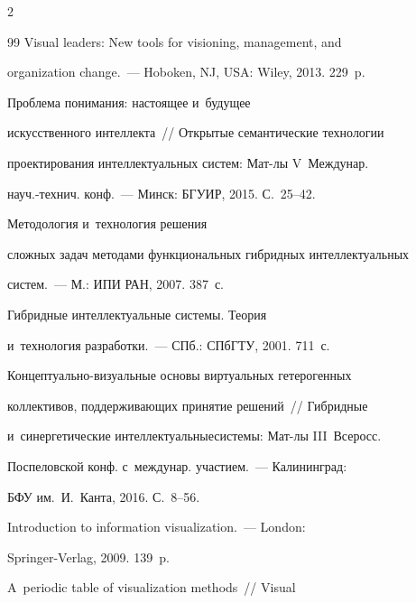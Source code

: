 \begin{multicols}{2}
{{\begin{thebibliography}{99}
 Visual leaders: New tools for visioning, management, and 


organization change.~--- Hoboken, NJ, USA: Wiley, 2013. 229~p.


 




   Проблема понимания: настоящее и~будущее 


искусственного интеллекта~// Открытые семантические технологии 


проектирования интеллектуальных систем: Мат-лы V~Междунар. 


науч.-технич. конф.~--- Минск: БГУИР, 2015. С.~25--42.




   Методология и~технология решения 


сложных задач методами функциональных гибридных интеллектуальных  


сис\-тем.~--- М.: ИПИ РАН, 2007. 387~с.




   Гибридные интеллектуальные системы. Теория 


и~технология разработки.~--- СПб.: \mbox{СПбГТУ}, 2001. 711~с.






Кон\-цеп\-ту\-аль\-но-ви\-зу\-аль\-ные основы виртуальных гетерогенных 


коллективов, поддерживающих принятие решений~// Гиб\-рид\-ные 


и~синергетические интеллектуальные\linebreak системы: Мат-лы III~Всеросс. 


Поспеловской конф. с~междунар. участием.~--- Калининград: 


БФУ им.\ И.~Канта, 2016. С.~8--56.




   Introduction to information visualization.~--- London:  


Springer-Verlag, 2009. 139~p.










  A~periodic table of visualization methods~// Visual 



\end{thebibliography}}}
\end{multicols}
